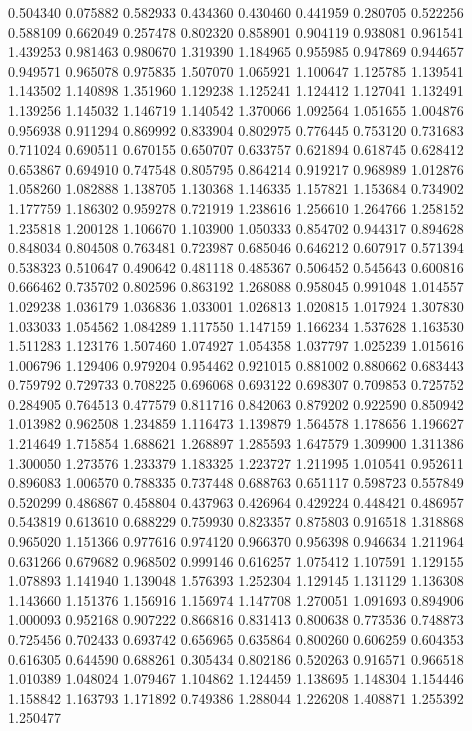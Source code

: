 0.504340
0.075882
0.582933
0.434360
0.430460
0.441959
0.280705
0.522256
0.588109
0.662049
0.257478
0.802320
0.858901
0.904119
0.938081
0.961541
1.439253
0.981463
0.980670
1.319390
1.184965
0.955985
0.947869
0.944657
0.949571
0.965078
0.975835
1.507070
1.065921
1.100647
1.125785
1.139541
1.143502
1.140898
1.351960
1.129238
1.125241
1.124412
1.127041
1.132491
1.139256
1.145032
1.146719
1.140542
1.370066
1.092564
1.051655
1.004876
0.956938
0.911294
0.869992
0.833904
0.802975
0.776445
0.753120
0.731683
0.711024
0.690511
0.670155
0.650707
0.633757
0.621894
0.618745
0.628412
0.653867
0.694910
0.747548
0.805795
0.864214
0.919217
0.968989
1.012876
1.058260
1.082888
1.138705
1.130368
1.146335
1.157821
1.153684
0.734902
1.177759
1.186302
0.959278
0.721919
1.238616
1.256610
1.264766
1.258152
1.235818
1.200128
1.106670
1.103900
1.050333
0.854702
0.944317
0.894628
0.848034
0.804508
0.763481
0.723987
0.685046
0.646212
0.607917
0.571394
0.538323
0.510647
0.490642
0.481118
0.485367
0.506452
0.545643
0.600816
0.666462
0.735702
0.802596
0.863192
1.268088
0.958045
0.991048
1.014557
1.029238
1.036179
1.036836
1.033001
1.026813
1.020815
1.017924
1.307830
1.033033
1.054562
1.084289
1.117550
1.147159
1.166234
1.537628
1.163530
1.511283
1.123176
1.507460
1.074927
1.054358
1.037797
1.025239
1.015616
1.006796
1.129406
0.979204
0.954462
0.921015
0.881002
0.880662
0.683443
0.759792
0.729733
0.708225
0.696068
0.693122
0.698307
0.709853
0.725752
0.284905
0.764513
0.477579
0.811716
0.842063
0.879202
0.922590
0.850942
1.013982
0.962508
1.234859
1.116473
1.139879
1.564578
1.178656
1.196627
1.214649
1.715854
1.688621
1.268897
1.285593
1.647579
1.309900
1.311386
1.300050
1.273576
1.233379
1.183325
1.223727
1.211995
1.010541
0.952611
0.896083
1.006570
0.788335
0.737448
0.688763
0.651117
0.598723
0.557849
0.520299
0.486867
0.458804
0.437963
0.426964
0.429224
0.448421
0.486957
0.543819
0.613610
0.688229
0.759930
0.823357
0.875803
0.916518
1.318868
0.965020
1.151366
0.977616
0.974120
0.966370
0.956398
0.946634
1.211964
0.631266
0.679682
0.968502
0.999146
0.616257
1.075412
1.107591
1.129155
1.078893
1.141940
1.139048
1.576393
1.252304
1.129145
1.131129
1.136308
1.143660
1.151376
1.156916
1.156974
1.147708
1.270051
1.091693
0.894906
1.000093
0.952168
0.907222
0.866816
0.831413
0.800638
0.773536
0.748873
0.725456
0.702433
0.693742
0.656965
0.635864
0.800260
0.606259
0.604353
0.616305
0.644590
0.688261
0.305434
0.802186
0.520263
0.916571
0.966518
1.010389
1.048024
1.079467
1.104862
1.124459
1.138695
1.148304
1.154446
1.158842
1.163793
1.171892
0.749386
1.288044
1.226208
1.408871
1.255392
1.250477
